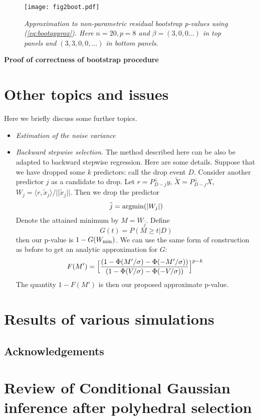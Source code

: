 \documentclass{article}
\begin{document}
{{\begin{figure}[hbtp]
\centering
\texttt{[image: fig2boot.pdf]}  
\caption{\em Approximation to non-parametric residual bootstrap p-values using (\ref{eq:bootapprox}). Here  $n=20, p=8$ and  $\beta=(3,0,0\ldots)$ in top panels and $(3,3,0,0,\ldots)$ in bottom panels.}
\label{fig:fig2boot}
\end{figure}

{\bf Proof of correctness of bootstrap procedure}

\section{Other topics and issues}
Here we briefly discuss some further topics.
\begin{itemize}
\item {\it Estimation of the noise variance}
\item{\it Backward stepwise selection}.
The method described here can be also be adapted to backward stepwise regression.
Here are some details.
Suppose that we have dropped some  $k$ predictors: call the drop event $D$.
Consider another  predictor  $j$ as a candidate to drop. Let $r=P_{D-j}^\perp y$, $\tilde X=P_{D-j}^\perp X$,
$W_j=\langle r, \tilde x_j\rangle/||\tilde x_j||$. Then we drop the predictor
\begin{eqnarray}
\hat j={\rm argmin }(|W_j|)
\end{eqnarray}
Denote the attained minimum by $M=W_{\hat j}$. Define
$$G(t)=P(M\geq t | D) $$
then our p-value is $1-G(W_{\rm min})$.
We can use the same form of construction as before to get an analytic approximation for $G$:
\begin{eqnarray}
F(M')=\Bigl[\frac{ (1-\Phi(M'/\sigma)-\Phi(-M'/\sigma))}{(1-\Phi(V/\sigma)-\Phi(-V/\sigma))}\Bigr]^{p-k}\
\label{eq:approx}
\end{eqnarray}
The quantity $1-F(M')$ is then our proposed approximate p-value.
\end{itemize}

\section{Results of various simulations}


\subsection*{Acknowledgements} 


\appendix
\section*{Review of Conditional Gaussian inference after polyhedral selection}  

}}
\end{document}
